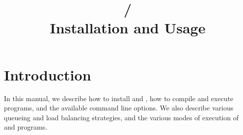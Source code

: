 \documentclass[10pt]{article}
\title{\charmpp{}/\converse{}\\Installation and Usage}
\begin{document}
\maketitle

\section{Introduction}
In this manual, we describe how to install \charmpp{} and
\converse{}, how to compile and execute programs, and the available
command line options.  We also describe various queueing and load balancing
strategies, and the various modes of execution of \converse{} and \charmpp{}
programs.




\end{document}
